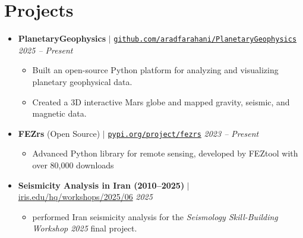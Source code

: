 \documentclass[letterpaper,11pt]{article}
\begin{document}
		\section{Projects}
		\vspace{-0.8em}
		\begin{itemize}[left=0pt, label={}, topsep=7.5pt, partopsep=0pt, itemsep=6pt, parsep=0pt]
			\item \textbf{PlanetaryGeophysics} $|$ \normalfont\href{https://github.com/aradfarahani/PlanetaryGeophysics/}{\texttt{github.com/aradfarahani/PlanetaryGeophysics}} \hfill \textit{2025 – Present}
			\begin{itemize}[left=15pt, label=\textbullet, topsep=4pt, partopsep=0pt, itemsep=3pt, parsep=0pt]
				\item Built an open-source Python platform for analyzing and visualizing planetary geophysical data.
				\item Created a 3D interactive Mars globe and mapped gravity, seismic, and magnetic data.
				
			\end{itemize}
		\end{itemize}
		\vspace{-1.4em}
		\begin{itemize}[left=0pt, label={}, topsep=7.5pt, partopsep=0pt, itemsep=6pt, parsep=0pt]
			\item \textbf{FEZrs} (Open Source) $|$ \normalfont\href{https://pypi.org/project/fezrs/}{\texttt{pypi.org/project/fezrs}} \hfill \textit{2023 – Present}
			\begin{itemize}[left=15pt, label=\textbullet, topsep=4pt, partopsep=0pt, itemsep=3pt, parsep=0pt]
				\item Advanced Python library for remote sensing, developed by FEZtool with over 80,000 downloads
			\end{itemize}
			
		\end{itemize}
		\vspace{-1.2em}
		\begin{itemize}[left=0pt, label={}, topsep=7.5pt, partopsep=0pt, itemsep=6pt, parsep=0pt]
			\item \textbf{Seismicity Analysis in Iran (2010–2025)} $|$ 
			\normalfont\href{https://nbviewer.org/urls/www.iris.edu/hq/files/short_courses/2020/ssb/iran_seismicity_analysis1.ipynb}
			{iris.edu/hq/workshops/2025/06} \hfill \textit{2025}
			
			\begin{itemize}[left=15pt, label=\textbullet, topsep=4pt, partopsep=0pt, itemsep=3pt, parsep=0pt]
				\item performed Iran seismicity analysis for the \textit{Seismology Skill-Building Workshop 2025} final project.
			\end{itemize}
		\end{itemize}
\end{document}

